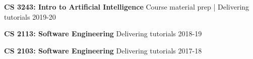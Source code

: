 


\begin{cvhonors}

  \cvhonor
    {\textbf{CS 3243: Intro to Artificial Intelligence}} %
    {Course material prep | Delivering tutorials} %
    {} %
    {2019-20} %
    
  \cvhonor
    {\textbf{CS 2113: Software Engineering}} %
    {Delivering tutorials} %
    {} %
    {2018-19} %
   
  \cvhonor
    {\textbf{CS 2103: Software Engineering}} %
    {Delivering tutorials} %
    {} %
    {2017-18} %


\end{cvhonors}
